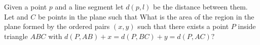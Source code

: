 Given a point $p$ and a line segment  let $d(p,l)$ be the distance between them.  Let   and $C$ be points in the plane such that     What is the area of the region in the plane formed by the ordered pairs $(x,y)$ such that there exists a point $P$ inside triangle $ABC$ with $d(P,AB)+x=d(P,BC)+y=d(P,AC)?$